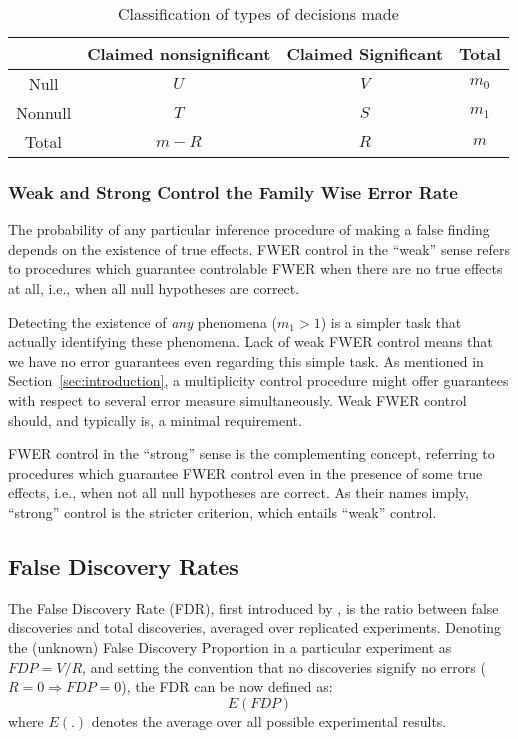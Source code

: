 \documentclass[review,12pt]{article}
\theoremstyle{definition}
\theoremstyle{definition}
\begin{document}
\begin{table}[h]
  \centering
\begin{tabular}{|c|c|c|c|}
\hline \rule[-1ex]{0pt}{1.5ex} & Claimed nonsignificant & Claimed Significant & Total \\ 
\hline
\hline \rule[-1ex]{0pt}{1.5ex} Null & $U$ & $V$ & $m_0$ \\ 
\hline \rule[-1ex]{0pt}{1.5ex} Nonnull & $T$ & $S$ & $m_1$ \\ 
\hline \rule[-1ex]{0pt}{1.5ex} Total & $m-R$ & $R$ & $m$ \\ 
\hline 
\end{tabular} 
  \caption{Classification of types of decisions made}
  \label{tab:event_notation}
\end{table}


\subsubsection{Weak and Strong Control the Family Wise Error Rate}
The probability of any particular inference procedure of making a false finding depends on the existence of true effects. FWER control in the ``weak'' sense refers to procedures which guarantee controlable FWER when there are no true effects at all, i.e., when all null hypotheses are correct. 

Detecting the existence of \emph{any} phenomena ($m_1>1$) is a simpler task that actually identifying these phenomena. Lack of weak FWER control means that we have no error guarantees even regarding this simple task. 
As mentioned in Section~\ref{sec:introduction}, a multiplicity control procedure might offer guarantees with respect to several error measure simultaneously. Weak FWER control should, and typically is, a minimal requirement. 

FWER control in the ``strong'' sense is the complementing concept, referring to procedures which guarantee FWER control even in the presence of some true effects, i.e., when not all null hypotheses are correct. 
As their names imply, ``strong'' control is the stricter criterion, which entails ``weak'' control.




\subsection{\label{sub:fdr}False Discovery Rates}

The False Discovery Rate (FDR), first introduced by \citet{benjamini_controlling_1995}, is the ratio between false discoveries and total discoveries, averaged over replicated experiments. 
Denoting the (unknown) False Discovery Proportion in a particular experiment as $ FDP=V/R $, and setting the convention that no discoveries signify no errors ($R=0 \Rightarrow FDP=0$), the FDR can be now defined as:
$$E \left( FDP \right)$$ 
where $E(.)$ denotes the average over all possible experimental results.
\end{document}
